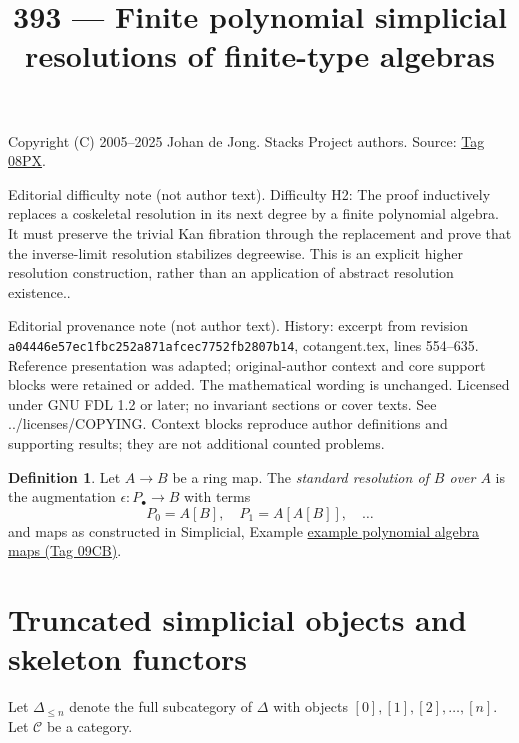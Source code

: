 \documentclass{amsart}
\theoremstyle{plain}
\theoremstyle{definition}
\newtheorem{definition}[subsection]{Definition}
\theoremstyle{remark}
\numberwithin{equation}{subsection}
\begin{document}
\title[Stacks Project, Tag 08PX]{393 --- Finite polynomial simplicial resolutions of finite-type algebras}
\maketitle
\noindent Copyright (C) 2005--2025 Johan de Jong. Stacks Project authors. Source: \href{https://stacks.math.columbia.edu/tag/08PX}{Tag 08PX}.

\noindent Editorial difficulty note (not author text). Difficulty H2: The proof inductively replaces a coskeletal resolution in its next degree by a finite polynomial algebra. It must preserve the trivial Kan fibration through the replacement and prove that the inverse-limit resolution stabilizes degreewise. This is an explicit higher resolution construction, rather than an application of abstract resolution existence..

\noindent Editorial provenance note (not author text). History: excerpt from revision \texttt{a0444\allowbreak 6e57e\allowbreak c1fbc\allowbreak 252a8\allowbreak 71afc\allowbreak ec775\allowbreak 2fb28\allowbreak 07b14}, cotangent.tex, lines 554--635. Reference presentation was adapted; original-author context and core support blocks were retained or added. The mathematical wording is unchanged. Licensed under GNU FDL 1.2 or later; no invariant sections or cover texts. See ../licenses/COPYING. Context blocks reproduce author definitions and supporting results; they are not additional counted problems.

\begin{definition}
\label{definition-standard-resolution}
Let $A \to B$ be a ring map. The {\it standard resolution of $B$ over $A$}
is the augmentation $\epsilon : P_\bullet \to B$ with terms
$$
P_0 = A[B],\quad P_1 = A[A[B]],\quad \ldots
$$
and maps as constructed in
Simplicial, Example \href{https://stacks.math.columbia.edu/tag/09CB}{example polynomial algebra maps (Tag 09CB)}.
\end{definition}

\section{Truncated simplicial objects and skeleton functors}
\label{simplicial-section-skeleton}

\noindent
Let $\Delta_{\leq n}$ denote the full subcategory of
$\Delta$ with objects $[0], [1], [2], \ldots, [n]$.
Let $\mathcal{C}$ be a category.
\end{document}
